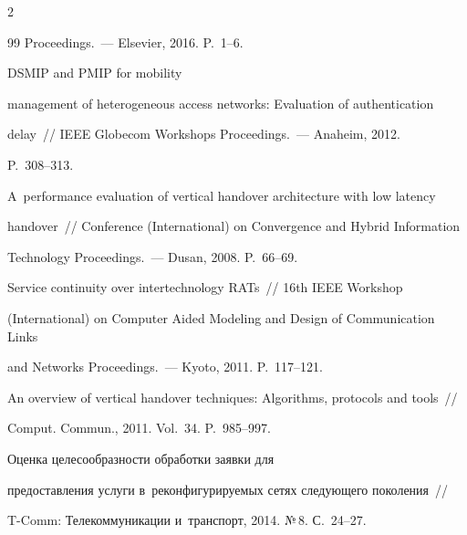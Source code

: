 \begin{multicols}{2}
{{\begin{thebibliography}{99}
Proceedings.~--- Elsevier, 2016. P.~1--6.




 DSMIP and PMIP for mobility 


management of heterogeneous access networks: Evaluation of authentication 


delay~//  IEEE Globecom Workshops Proceedings.~--- Anaheim, 2012.  


P.~308--313.









A~performance evaluation of vertical handover architecture with low latency 


handover~//  Conference (International) on Convergence and Hybrid Information 


Technology Proceedings.~--- Dusan, 2008. P.~66--69.









Service continuity over intertechnology RATs~// 16th IEEE  Workshop 


(International) on Computer Aided Modeling and Design of Communication Links 


and Networks Proceedings.~--- Kyoto, 2011. P.~117--121.









An overview of vertical handover techniques: Algorithms, protocols and tools~// 


Comput. Commun., 2011. Vol.~34. P.~985--997.




 Оценка целесообразности обработки заявки для 


предоставления услуги в~реконфигурируемых сетях следующего поколения~// 


T-Comm: Телекоммуникации и~транспорт, 2014. №\,8. С.~24--27. 





\end{thebibliography}}}
\end{multicols}
